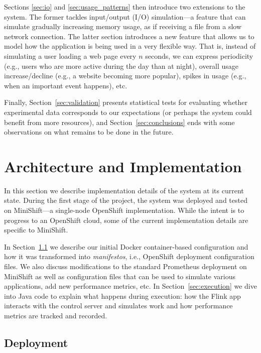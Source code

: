 \documentclass{article}
\begin{document}
Sections \ref{sec:io} and \ref{sec:usage_patterns} then introduce two
extensions to the system. The former tackles input/output (I/O) simulation---a
feature  that can simulate gradually increasing memory usage, as if receiving a
file from a slow network connection. The latter section introduces a new feature
that allows us to model how the application is being used in a very flexible
way. That is, instead of simulating a user loading a web page every $n$ seconds, we
can express periodicity (e.g., users who are more active during the day than at
night), overall usage increase/decline (e.g., a website becoming more popular),
spikes in usage (e.g., when an important event happens), etc.

Finally, Section~\ref{sec:validation} presents statistical
tests for evaluating whether experimental data corresponds to our expectations
(or perhaps the system could benefit from more resources), and
Section~\ref{sec:conclusions} ends with some observations on what remains to be
done in the future.

\section{Architecture and Implementation} \label{sec:implementation}

In this section we describe implementation details of the system at its current
state. During the first stage of the project, the system was deployed and tested
on MiniShift---a single-node OpenShift implementation. While the intent is to
progress to an OpenShift cloud, some of the current implementation details are
specific to MiniShift.

In Section~\ref{sec:deployment} we describe our initial Docker
container-based configuration and how it was transformed into \emph{manifestos},
i.e., OpenShift deployment configuration files. We also discuss modifications to
the standard Prometheus deployment on MiniShift as well as configuration files
that can be used to simulate various applications, add new performance metrics,
etc. In Section~\ref{sec:execution} we dive into Java code to explain what
happens during execution: how the Flink app interacts with the control server
and simulates work and how performance metrics are tracked and recorded.

\subsection{Deployment} \label{sec:deployment}
\end{document}

